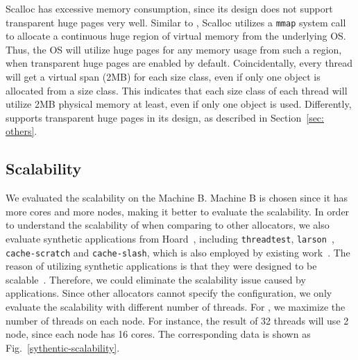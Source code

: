  Scalloc has excessive memory consumption, since its design does not support transparent huge pages very well. Similar to \NM{}, Scalloc utilizes a \texttt{mmap} system call to allocate a continuous huge region of virtual memory from the underlying OS. Thus, the OS will utilize huge pages for any memory usage from such a region, when transparent huge pages are enabled by default. Coincidentally, every thread will get a virtual span (2MB) for each size class, even if only one object is allocated from a size class. This indicates that each size class of each thread will utilize 2MB physical memory at least, even if only one object is used.  Differently, \NM{} supports transparent huge pages in its design, as described in Section~\ref{sec: others}.
 

\subsection{Scalability}
\label{sec:scale}

We evaluated the scalability on the Machine B. Machine B is chosen since it has more cores and more nodes, making it better to evaluate the scalability.  In order to understand the scalability of \NM{} when comparing to other allocators, we also evaluate synthetic applications from Hoard~\cite{Hoard}, including \texttt{threadtest}, \texttt{larson}~\cite{Larson}, \texttt{cache-scratch} and \texttt{cache-slash}, which is also employed by existing work~\cite{Scalloc}.  The reason of utilizing synthetic applications is that they were designed to be scalable~\cite{Scalloc}. Therefore, we could eliminate the scalability issue caused by applications. Since other allocators cannot specify the configuration, we only evaluate the scalability with different number of threads. For \NM{}, we maximize the number of threads on each node. For instance, the result of 32 threads will use 2 node, since each node has 16 cores. The corresponding data is shown as Fig.~\ref{sythentic-scalability}. 


